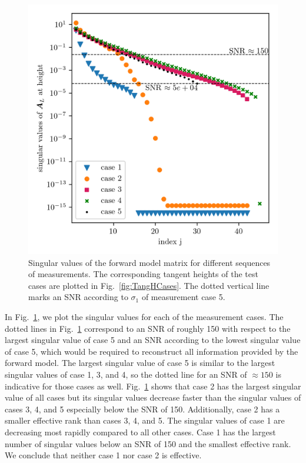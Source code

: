 \begin{figure}[ht!]
	\centering
	\includegraphics{SingValA.png}
	\caption[Singular values of linear forward model matrix for different sequences of measurements.]{Singular values of the forward model matrix for different sequences of measurements.
	The corresponding tangent heights of the test cases are plotted in Fig.~\ref{fig:TangHCases}. The dotted vertical line marks an SNR according to $\sigma_1$ of measurement case 5.}
\label{fig:SingA}
\end{figure}
In Fig.~\ref{fig:SingA}, we plot the singular values for each of the measurement cases.
The dotted lines in Fig.~\ref{fig:SingA} correspond to an SNR of roughly 150 with respect to the largest singular value of case 5 and an SNR according to the lowest singular value of case 5, which would be required to reconstruct all information provided by the forward model.
The largest singular value of case 5 is similar to the largest singular values of case 1, 3, and 4, so the dotted line for an SNR of $\approx 150$ is indicative for those cases as well.
Fig.~\ref{fig:SingA} shows that case 2 has the largest singular value of all cases but its singular values decrease faster than the singular values of cases 3, 4, and 5 especially below the SNR of 150.
Additionally, case 2 has a smaller effective rank than cases 3, 4, and 5.
The singular values of case 1 are decreasing most rapidly compared to all other cases. Case 1 has the largest number of singular values below an SNR of 150 and the smallest effective rank.
We conclude that neither case 1 nor case 2 is effective.

